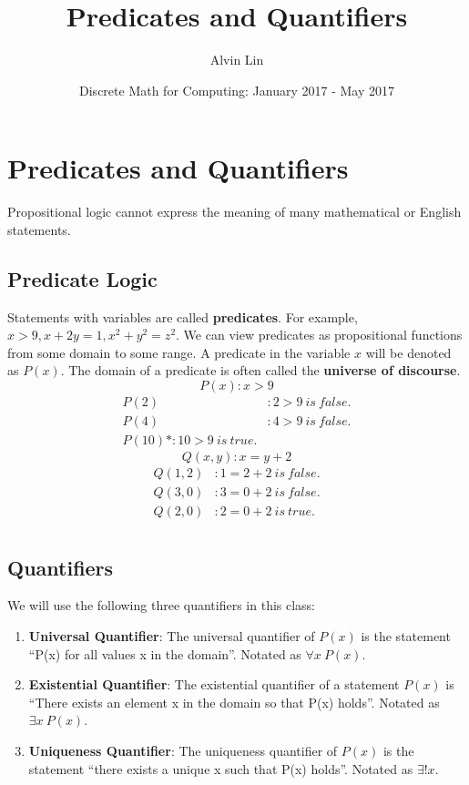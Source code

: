 \documentclass[letterpaper, 12pt]{math}
\title{Predicates and Quantifiers}
\author{Alvin Lin}
\date{Discrete Math for Computing: January 2017 - May 2017}
\begin{document}
\maketitle

\section*{Predicates and Quantifiers}
Propositional logic cannot express the meaning of many mathematical or
English statements.

\subsection*{Predicate Logic}
Statements with variables are called \textbf{predicates}. For example,
\( x > 9, x+2y = 1, x^{2}+y^{2} = z^{2} \).
We can view predicates as propositional functions from some domain to some
range. A predicate in the variable \( x \) will be denoted as \( P(x) \). The
domain of a predicate is often called the \textbf{universe of discourse}.
\[ P(x): x > 9 \]
\begin{align*}
  P(2)&: 2 > 9\ is\ false. \\
  P(4)&: 4 > 9\ is\ false. \\
  P(10)*: 10 > 9\ is\ true.
\end{align*}
\[ Q(x,y): x = y+2 \]
\begin{align*}
  Q(1,2)&: 1 = 2+2\ is\ false. \\
  Q(3,0)&: 3 = 0+2\ is\ false. \\
  Q(2,0)&: 2 = 0+2\ is\ true. \\
\end{align*}

\subsection*{Quantifiers}
We will use the following three quantifiers in this class:
\begin{enumerate}
  \item \textbf{Universal Quantifier}: The universal quantifier of \( P(x) \)
    is the statement ``P(x) for all values x in the domain''. Notated as
    \( \forall x\ P(x) \).
  \item \textbf{Existential Quantifier}: The existential quantifier of a
    statement \( P(x) \) is ``There exists an element x in the domain so
    that P(x) holds''. Notated as
    \( \exists x\ P(x) \).
  \item \textbf{Uniqueness Quantifier}: The uniqueness quantifier of \( P(x) \)
    is the statement ``there exists a unique x such that P(x) holds''. Notated
    as \( \exists!x \).
\end{enumerate}
\end{document}
